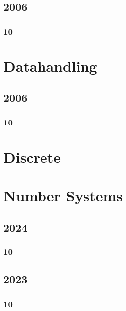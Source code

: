 \documentclass[11pt]{book}
\begin{document}
\section{2006}                       
\subsection{10}


\chapter{Datahandling}
\section{2006}
\subsection{10}


\chapter{Discrete}
%

\chapter{Number Systems}
\section{2024}
\subsection{10}

\section{2023}
\subsection{10}

%
\end{document}
